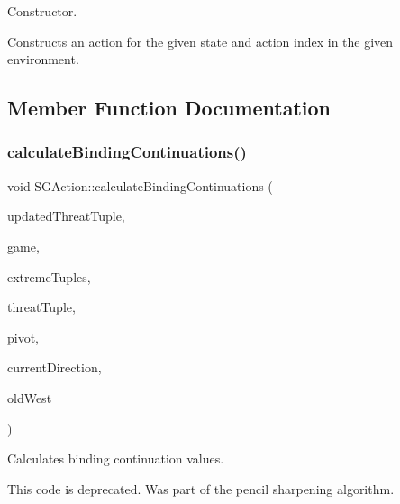 Constructor. 

Constructs an action for the given state and action index in the given environment. 

\subsection{Member Function Documentation}
\mbox{\label{classSGAction_af0097be42f837e507097036df744f481}} 
\subsubsection{\texorpdfstring{calculate\+Binding\+Continuations()}{calculateBindingContinuations()}}
{\footnotesize\ttfamily void S\+G\+Action\+::calculate\+Binding\+Continuations (\begin{DoxyParamCaption}\item[{const vector$<$ bool $>$ \&}]{updated\+Threat\+Tuple,  }\item[{const \hyperlink{classSGGame}{S\+G\+Game} \&}]{game,  }\item[{const vector$<$ \hyperlink{classSGTuple}{S\+G\+Tuple} $>$ \&}]{extreme\+Tuples,  }\item[{const \hyperlink{classSGTuple}{S\+G\+Tuple} \&}]{threat\+Tuple,  }\item[{const \hyperlink{classSGTuple}{S\+G\+Tuple} \&}]{pivot,  }\item[{const \hyperlink{classSGPoint}{S\+G\+Point} \&}]{current\+Direction,  }\item[{int}]{old\+West }\end{DoxyParamCaption})}



Calculates binding continuation values. 

This code is deprecated. Was part of the pencil sharpening algorithm. \mbox{\label{classSGAction_a9d6073bab90739b098d8653d2eb51c6b}} 
